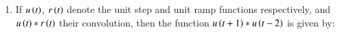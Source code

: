 \documentclass[journal]{IEEEtran}
\begin{document}
\begin{enumerate}
\item If $u\left(t\right)$, $r\left(t\right)$ denote the unit step and unit ramp functions respectively, and $u\left(t\right) * r\left(t\right)$ their convolution, then the function $u\left(t+1\right) * u\left(t-2\right)$ is given by:
\begin{enumerate}
\end{enumerate}
	\end{enumerate}
\end{document}
